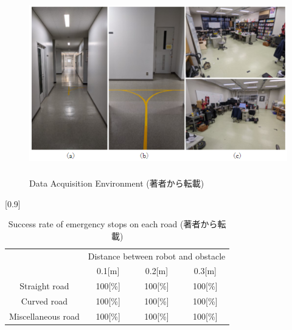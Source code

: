 \begin{figure}[h]
  \begin{center}
  \includegraphics[height=80mm,clip]{figure/2-1_Data-Acquisition-Environment.png}
  \caption{Data Acquisition Environment (著者\cite{深層学習を用いた人追従機能の開発}から転載)}
  \label{2-1_Data Acquisition Environment}
  \end{center}
\end{figure}

\begin{table}[h]
  \begin{center}
    \caption{{Success rate of emergency stops on each road (著者\cite{深層学習を用いた人追従機能の開発}から転載)}
    \label{2-1_Success rate of emergency stops on each road}}
    \scalebox{1.0}[0.9]{
      \begin{tabular}{c|ccc} \hline
        \multicolumn{1}{c|}{} & \multicolumn{3}{c}{Distance between robot and obstacle} \\
        \cline{2-4}
        \multicolumn{1}{c|}{}
          & 0.1[m] & 0.2[m] & 0.3[m] \\ \hline
          Straight road & 100[\%] & 100[\%] & 100[\%] \\
          Curved road & 100[\%] & 100[\%] & 100[\%] \\
          Miscellaneous road & 100[\%] & 100[\%] & 100[\%] \\ \hline
      \end{tabular}
    }
  \end{center}
\end{table}

\clearpage

